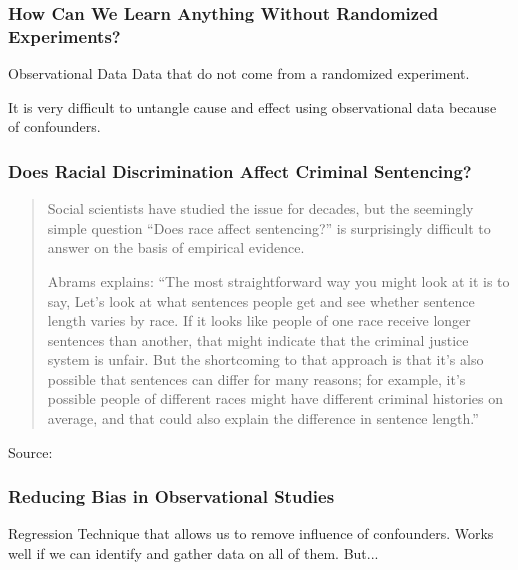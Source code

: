 \documentclass{beamer}
\begin{document}
\begin{frame}
\frametitle{How Can We Learn Anything Without Randomized Experiments?}
	\begin{block}{Observational Data}
		Data that do not come from a randomized experiment.	
	\end{block}
	\vspace{2em}
	\begin{alertblock}{It is very difficult to untangle cause and effect using observational data because of confounders.}
	\end{alertblock}
\end{frame}

\begin{frame}
\frametitle{Does Racial Discrimination  Affect Criminal Sentencing?}
	\begin{quote}
	\footnotesize
		Social scientists have studied the issue for decades, but the seemingly simple question ``Does race affect sentencing?'' is surprisingly difficult to answer on the basis of empirical evidence.
		
		Abrams explains: \alert{``The most straightforward way you might look at it is to say, Let’s look at what sentences people get and see whether sentence length varies by race. If it looks like people of one race receive longer sentences than another, that might indicate that the criminal justice system is unfair. But the shortcoming to that approach is that it’s also possible that sentences can differ for many reasons; for example, it’s possible people of different races might have different criminal histories on average, and that could also explain the difference in sentence length.''}
	\end{quote}
	\tiny{Source: \href{https://www.law.upenn.edu/live/news/2170-new-study-by-professor-david-s-abrams-confirms}{}}
\end{frame}

\begin{frame}
\frametitle{Reducing Bias in Observational Studies}
	\begin{block}{Regression}
	Technique that allows us to remove influence of confounders. Works well if we can identify and gather data on all of them. But...
	\end{block}
\end{frame}
\end{document}
